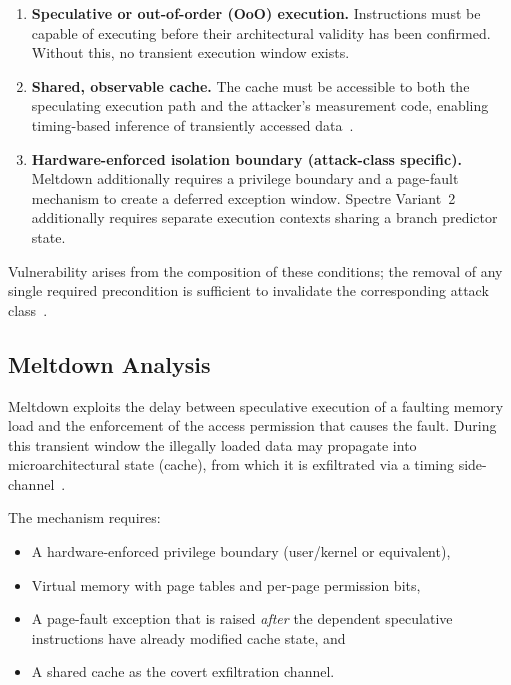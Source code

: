 \begin{enumerate}
  \item \textbf{Speculative or out-of-order (OoO) execution.}  Instructions must be
        capable of executing before their architectural validity has been confirmed.
        Without this, no transient execution window exists.
  \item \textbf{Shared, observable cache.}  The cache must be accessible to both the
        speculating execution path and the attacker's measurement code, enabling
        timing-based inference of transiently accessed data~\cite{gruss2016flushflush}.
  \item \textbf{Hardware-enforced isolation boundary (attack-class specific).}
        Meltdown additionally requires a privilege boundary and a page-fault mechanism
        to create a deferred exception window.  Spectre Variant~2 additionally requires
        separate execution contexts sharing a branch predictor state.
\end{enumerate}

Vulnerability arises from the composition of these conditions; the removal of any
single required precondition is sufficient to invalidate the corresponding attack
class~\cite{intel2018analysis}.

\subsection{Meltdown Analysis}

Meltdown exploits the delay between speculative execution of a faulting memory load
and the enforcement of the access permission that causes the fault.  During this
transient window the illegally loaded data may propagate into microarchitectural state
(cache), from which it is exfiltrated via a timing side-channel~\cite{lipp2018meltdown}.

The mechanism requires:
\begin{itemize}
  \item A hardware-enforced privilege boundary (user/kernel or equivalent),
  \item Virtual memory with page tables and per-page permission bits,
  \item A page-fault exception that is raised \emph{after} the dependent speculative
        instructions have already modified cache state, and
  \item A shared cache as the covert exfiltration channel.
\end{itemize}

